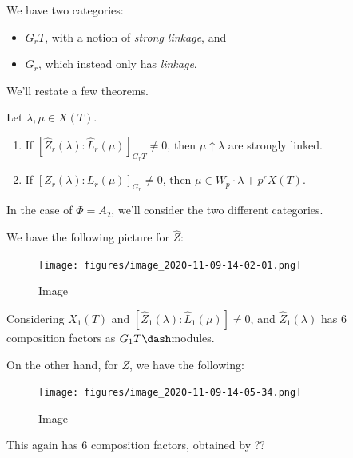 We have two categories:

\begin{itemize}
\tightlist
\item
  \(G_r T\), with a notion of \emph{strong linkage}, and
\item
  \(G_r\), which instead only has \emph{linkage}.
\end{itemize}

We'll restate a few theorems.

\begin{theorem}[?]

\envlist

Let \(\lambda, \mu \in X(T)\).

\begin{enumerate}
\def\labelenumi{\arabic{enumi}.}
\item
  If \([\hat{Z}_r(\lambda) : \hat{L}_r(\mu) ]_{G_r T} \neq 0\), then
  \(\mu \uparrow \lambda\) are strongly linked.
\item
  If \([{Z}_r(\lambda) : {L}_r(\mu) ]_{G_r} \neq 0\), then
  \(\mu \in W_p \cdot\lambda + p^r X(T)\).
\end{enumerate}

\end{theorem}

\begin{example}[?]

In the case of \(\Phi = A_2\), we'll consider the two different
categories.

We have the following picture for \(\hat{Z}\):

\begin{figure}
\centering
\texttt{[image: figures/image\_2020-11-09-14-02-01.png]}
\caption{Image}
\end{figure}

Considering \(X_1(T)\) and
\([\hat{Z}_1(\lambda) : \hat{L}_1(\mu)] \neq 0\), and
\(\hat{Z}_1(\lambda)\) has 6 composition factors as
\(G_1T\dash\)modules.

On the other hand, for \(Z\), we have the following:

\begin{figure}
\centering
\texttt{[image: figures/image\_2020-11-09-14-05-34.png]}
\caption{Image}
\end{figure}

This again has 6 composition factors, obtained by ??


\end{example}

